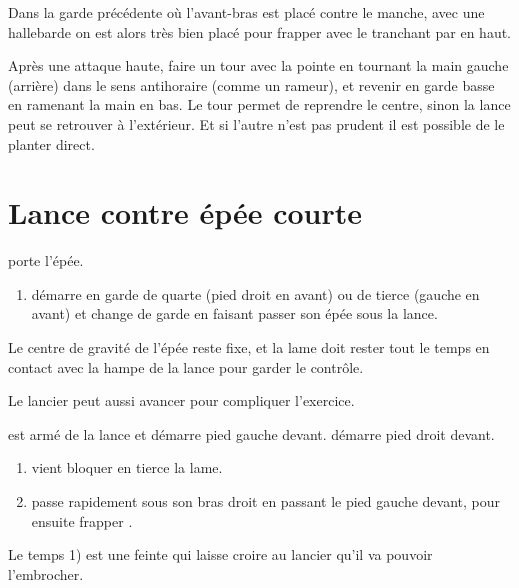 Dans la garde précédente où l'avant-bras est placé contre le manche, avec une hallebarde on est alors très bien placé pour frapper avec le tranchant par en haut.

\begin{technique}
Après une attaque haute, faire un tour avec la pointe en tournant la main gauche (arrière) dans le sens antihoraire (comme un rameur), et revenir en garde basse en ramenant la main en bas.
Le tour permet de reprendre le centre, sinon la lance peut se retrouver à l'extérieur.
Et si l'autre n'est pas prudent il est possible de le planter direct.
\end{technique}


\section{Lance contre épée courte}


\begin{exercice}

\A porte l'épée.

\begin{enumerate}
	\item \A démarre en garde de quarte (pied droit en avant) ou de tierce (gauche en avant) et change de garde en faisant passer son épée sous la lance.
\end{enumerate}

Le centre de gravité de l'épée reste fixe, et la lame doit rester tout le temps en contact avec la hampe de la lance pour garder le contrôle.

Le lancier peut aussi avancer pour compliquer l'exercice.
\end{exercice}


\begin{technique}

\D est armé de la lance et démarre pied gauche devant.
\A démarre pied droit devant.

\begin{enumerate}
	\item \A vient bloquer en tierce la lame.
	
	\item \A passe rapidement sous son bras droit en passant le pied gauche devant, pour ensuite frapper \D.
\end{enumerate}

Le temps 1) est une feinte qui laisse croire au lancier qu'il va pouvoir l'embrocher.
\end{technique}


